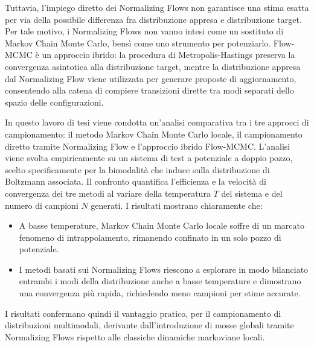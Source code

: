 Tuttavia, l'impiego diretto dei Normalizing Flows non garantisce una stima esatta per via della possibile differenza fra distribuzione appresa e distribuzione target. Per tale motivo, i Normalizing Flows non vanno intesi come un sostituto di Markov Chain Monte Carlo, bensì come uno strumento per potenziarlo. Flow-MCMC è un approccio ibrido: la procedura di Metropolis-Hastings preserva la convergenza asintotica alla distribuzione target, mentre la distribuzione appresa dal Normalizing Flow viene utilizzata per generare proposte di aggiornamento, consentendo alla catena di compiere transizioni dirette tra modi separati dello spazio delle configurazioni.

In questo lavoro di tesi viene condotta un'analisi comparativa tra i tre approcci di campionamento: il metodo Markov Chain Monte Carlo locale, il campionamento diretto tramite Normalizing Flow e l'approccio ibrido Flow-MCMC. 
L'analisi viene svolta empiricamente su un sistema di test a potenziale a doppio pozzo, scelto specificamente per la bimodalità che induce sulla distribuzione di Boltzmann associata. Il confronto quantifica l'efficienza e la velocità di convergenza dei tre metodi al variare della temperatura $T$ del sistema e del numero di campioni $N$ generati. I risultati mostrano chiaramente che:
\begin{itemize}
    \item A basse temperature, Markov Chain Monte Carlo locale soffre di un marcato fenomeno di intrappolamento, rimanendo confinato in un solo pozzo di potenziale.
    \item I metodi basati sui Normalizing Flows riescono a esplorare in modo bilanciato entrambi i modi della distribuzione anche a basse temperature e dimostrano una convergenza più rapida, richiedendo meno campioni per stime accurate.
\end{itemize}
I risultati confermano quindi il vantaggio pratico, per il campionamento di distribuzioni multimodali, derivante dall'introduzione di mosse globali tramite Normalizing Flows rispetto alle classiche dinamiche markoviane locali.

